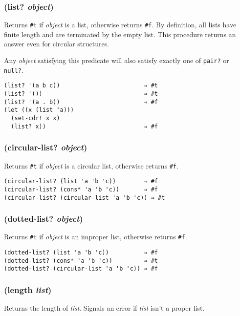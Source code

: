 \documentclass{article}
\begin{document}
\subsubsection{(list? \emph{object})}

Returns \verb|#t| if \emph{object} is a list, otherwise returns \verb|#f|. By
definition, all lists have finite length and are terminated by the empty list. This procedure
returns an answer even for circular structures.

Any \emph{object} satisfying this predicate will also satisfy exactly one of \verb|pair?| or
\verb|null?|.

\begin{verbatim}
(list? '(a b c))                        ⇒ #t
(list? '())                             ⇒ #t
(list? '(a . b))                        ⇒ #f
(let ((x (list 'a)))
  (set-cdr! x x)
  (list? x))                            ⇒ #f
\end{verbatim}

\subsubsection{(circular-list? \emph{object})}

Returns \verb|#t| if \emph{object} is a circular list, otherwise returns \verb|#f|.

\begin{verbatim}
(circular-list? (list 'a 'b 'c))        ⇒ #f
(circular-list? (cons* 'a 'b 'c))       ⇒ #f
(circular-list? (circular-list 'a 'b 'c)) ⇒ #t
\end{verbatim}

\subsubsection{(dotted-list? \emph{object})}

Returns \verb|#t| if \emph{object} is an improper list, otherwise returns \verb|#f|.

\begin{verbatim}
(dotted-list? (list 'a 'b 'c))          ⇒ #f
(dotted-list? (cons* 'a 'b 'c))         ⇒ #t
(dotted-list? (circular-list 'a 'b 'c)) ⇒ #f
\end{verbatim}

\subsubsection{(length \emph{list})}

Returns the length of \emph{list}. Signals an error if \emph{list} isn't a proper list.
\end{document}
